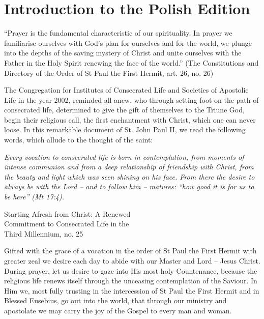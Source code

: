
\setlength{\parskip}{1em}

\section*{Introduction to the Polish Edition}

{``Prayer is the fundamental characteristic of our spirituality. In prayer we familiarise ourselves with God's plan for ourselves and for the world, we plunge into the depths of the saving mystery of Christ and unite ourselves with the Father in the Holy Spirit renewing the face of the world.'' (The Constitutions and Directory of the Order of St Paul the First Hermit, art. 26, no. 26)\par}

{The Congregation for Institutes of Consecrated Life and Societies of Apostolic Life in the year 2002, reminded all anew, who through setting foot on the path of consecrated life, determined to give the gift of themselves to the Triune God, begin their religious call, the first enchantment with Christ, which one can never loose. In this remarkable document of St. John Paul II, we read the following words, which allude to the thought of the saint:\par}

\begin{addmargin}[2em]{2em}
\textit{Every vocation to consecrated life is born in contemplation, from moments of intense communion and from a deep relationship of friendship with Christ, from the beauty and light which was seen shining on his face. From there the desire to always be with the Lord -- and to follow him -- matures: ``how good it is for us to be here'' (Mt 17:4).}
\end{addmargin}

\begin{flushright}
Starting Afresh from Christ: A Renewed \\
Commitment to Consecrated Life in the \\
Third Millennium, no. 25
\end{flushright}


{Gifted with the grace of a vocation in the order of St Paul the First Hermit with greater zeal we desire each day to abide with our Master and Lord -- Jesus Christ. During prayer, let us desire to gaze into His most holy Countenance, because the religious life renews itself through the unceasing contemplation of the Saviour. In Him we, most fully trusting in the intercession of St Paul the First Hermit and in Blessed Eusebius, go out into the world, that through our ministry and apostolate we may carry the joy of the Gospel to every man and woman.\par}


